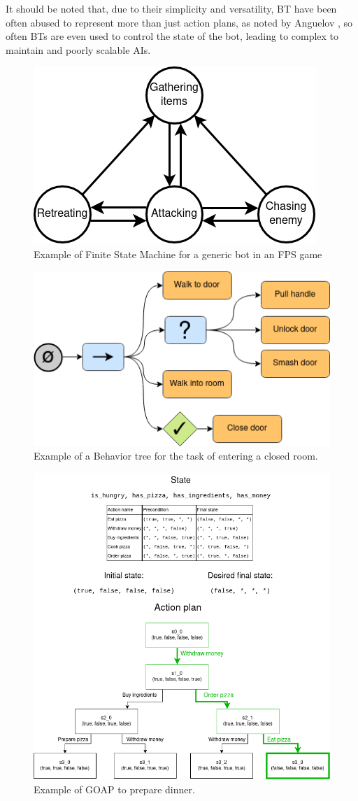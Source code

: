 It should be noted that, due to their simplicity and versatility, BT have been often abused to represent more than just action plans, as noted by Anguelov \citep{bt_abuse}, so often BTs are even used to control the state of the bot, leading to complex to maintain and poorly scalable AIs.
\begin{figure}
\begin{center}
\includegraphics[width=0.4\linewidth]{Images/images/FSM.drawio.png}
\caption{Example of Finite State Machine for a generic bot in an FPS game}
\label{fig:fsm_bot}
\end{center}
\end{figure}
\vspace{1cm}
\begin{figure}
\begin{center}
\includegraphics[width=0.5\linewidth]{Images/images/BTTutorial.drawio.png}
\caption{Example of a Behavior tree for the task of entering a closed room.}
\label{fig:tutorial_bt}
\end{center}
\end{figure}
\vspace{1cm}
\begin{figure}
\begin{center}
\includegraphics[width=0.8\linewidth]{Images/images/GOAP_NEW.png}
\caption{Example of GOAP to prepare dinner.}
\label{fig:tutorial_goap}
\end{center}
\end{figure}

